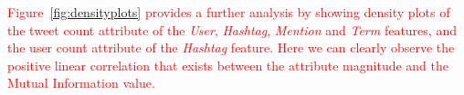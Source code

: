 \textcolor{red}{Figure~\ref{fig:densityplots} provides a further analysis by showing
density plots of the tweet count attribute  of the \textit{User}, \textit{Hashtag},
\textit{Mention} and \textit{Term}  features, and the user count attribute of 
the \textit{Hashtag} feature. Here we can clearly observe the positive linear correlation
that exists between the attribute magnitude and the Mutual Information value.
}



